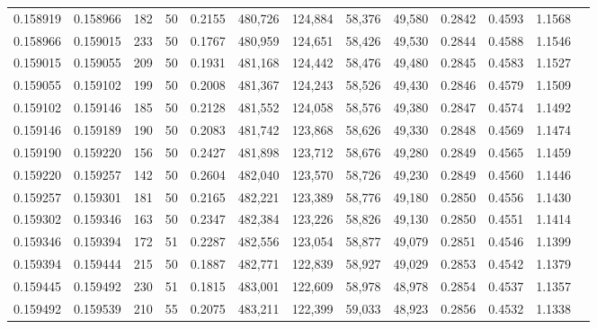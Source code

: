 \begin{tabular}{rrrrrrrrrrrrr}
0.158919 & 0.158966 &   182 &  50 &                                     0.2155 & 480,726 & 124,884 &  58,376 &  49,580 & 0.2842 & 0.4593 & 1.1568 \\
0.158966 & 0.159015 &   233 &  50 &                                     0.1767 & 480,959 & 124,651 &  58,426 &  49,530 & 0.2844 & 0.4588 & 1.1546 \\
0.159015 & 0.159055 &   209 &  50 &                                     0.1931 & 481,168 & 124,442 &  58,476 &  49,480 & 0.2845 & 0.4583 & 1.1527 \\
0.159055 & 0.159102 &   199 &  50 &                                     0.2008 & 481,367 & 124,243 &  58,526 &  49,430 & 0.2846 & 0.4579 & 1.1509 \\
0.159102 & 0.159146 &   185 &  50 &                                     0.2128 & 481,552 & 124,058 &  58,576 &  49,380 & 0.2847 & 0.4574 & 1.1492 \\
0.159146 & 0.159189 &   190 &  50 &                                     0.2083 & 481,742 & 123,868 &  58,626 &  49,330 & 0.2848 & 0.4569 & 1.1474 \\
0.159190 & 0.159220 &   156 &  50 &                                     0.2427 & 481,898 & 123,712 &  58,676 &  49,280 & 0.2849 & 0.4565 & 1.1459 \\
0.159220 & 0.159257 &   142 &  50 &                                     0.2604 & 482,040 & 123,570 &  58,726 &  49,230 & 0.2849 & 0.4560 & 1.1446 \\
0.159257 & 0.159301 &   181 &  50 &                                     0.2165 & 482,221 & 123,389 &  58,776 &  49,180 & 0.2850 & 0.4556 & 1.1430 \\
0.159302 & 0.159346 &   163 &  50 &                                     0.2347 & 482,384 & 123,226 &  58,826 &  49,130 & 0.2850 & 0.4551 & 1.1414 \\
0.159346 & 0.159394 &   172 &  51 &                                     0.2287 & 482,556 & 123,054 &  58,877 &  49,079 & 0.2851 & 0.4546 & 1.1399 \\
0.159394 & 0.159444 &   215 &  50 &                                     0.1887 & 482,771 & 122,839 &  58,927 &  49,029 & 0.2853 & 0.4542 & 1.1379 \\
0.159445 & 0.159492 &   230 &  51 &                                     0.1815 & 483,001 & 122,609 &  58,978 &  48,978 & 0.2854 & 0.4537 & 1.1357 \\
0.159492 & 0.159539 &   210 &  55 &                                     0.2075 & 483,211 & 122,399 &  59,033 &  48,923 & 0.2856 & 0.4532 & 1.1338 \\

\end{tabular}
